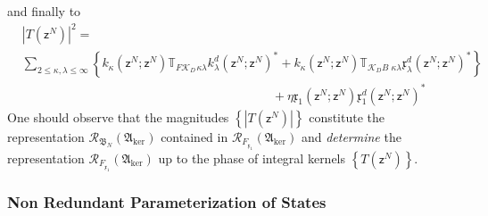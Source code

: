 \documentclass[aps,preprint]{revtex4}%
\begin{document}
and finally to
\begin{align}
&  \left\vert T\left(  \mathsf{z}^{N}\right)  \right\vert ^{2}=\nonumber\\
&  \sum_{2\leq\kappa,\lambda\leq\infty}\left\{  k_{\kappa}\left(
\mathsf{z}^{N};\mathsf{z}^{N}\right)  \mathbb{T}_{F\mathcal{K}_{D\,}%
\kappa\lambda}k_{\lambda}^{d}\left(  \mathsf{z}^{N};\mathsf{z}^{N}\right)
^{\ast}+k_{\kappa}\left(  \mathsf{z}^{N};\mathsf{z}^{N}\right)  \mathbb{T}%
_{\mathcal{K}_{D}B}\,_{\kappa\lambda}\mathfrak{x}_{\lambda}^{d}\left(
\mathsf{z}^{N};\mathsf{z}^{N}\right)  ^{\ast}\right\} \nonumber\\
&  \qquad\qquad\qquad\qquad\qquad\qquad\qquad\qquad\qquad\qquad+\eta
\mathfrak{x}_{1}\left(  \mathsf{z}^{N};\mathsf{z}^{N}\right)  \mathfrak{x}%
_{1}^{d}\left(  \mathsf{z}^{N};\mathsf{z}^{N}\right)  ^{\ast}%
\end{align}
One should observe that the magnitudes $\left\{  \left\vert T\left(
\mathsf{z}^{N}\right)  \right\vert \right\}  $ constitute the representation
$\mathcal{R}_{\mathfrak{B}_{N}}\left(  \mathfrak{A}_{\ker}\right)  $ contained
in $\mathcal{R}_{F_{\mathfrak{x}_{1}}}\left(  \mathfrak{A}_{\ker}\right)  $
and \emph{determine} the representation $\mathcal{R}_{F_{\mathfrak{x}_{1}}%
}\left(  \mathfrak{A}_{\ker}\right)  $ up to the phase of integral kernels
$\left\{  T\left(  \mathsf{z}^{N}\right)  \right\}  $.

\subsubsection{Non Redundant Parameterization of States}
\end{document}
